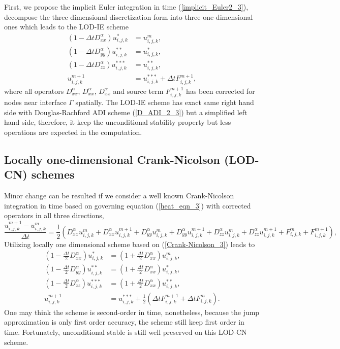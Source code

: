 \documentclass[dissertation]{uathesis}
\begin{document}
\begin{body}
First, we propose the implicit Euler integration in time (\ref{implicit_Euler2_3}), decompose the three dimensional discretization form into three one-dimensional ones which leads to the LOD-IE scheme
%
\begin{align} \label{D_LODIE_3}
(1-\Delta t D^{\alpha}_{xx}) u^{*}_{i,j,k}   &= u^{m}_{i,j,k}, \nonumber \\
(1-\Delta t D^{\alpha}_{yy}) u^{**}_{i,j,k}  &= u^{*}_{i,j,k},  \\
(1-\Delta t D^{\alpha}_{zz}) u^{***}_{i,j,k} &= u^{**}_{i,j,k}, \nonumber \\
u^{m+1}_{i,j,k} &= u^{***}_{i,j,k} + \Delta t F^{m+1}_{i,j,k},
\end{align}
%
where all operators $D^{\alpha}_{xx}$, $D^{\alpha}_{xx}$, $D^{\alpha}_{xx}$ and source term $F^{m+1}_{i,j,k}$ has been corrected for nodes near interface $\Gamma$ spatially. The LOD-IE scheme has exact same right hand side with Douglas-Rachford ADI scheme (\ref{D_ADI_2_3}) but a simplified left hand side, therefore, it keep the unconditional stability property but less operations are expected in the computation.

\subsection{Locally one-dimensional Crank-Nicolson (LOD-CN) schemes}
Minor change can be resulted if we consider a well known Crank-Nicolson integration in time based on governing equation (\ref{heat_eqn_3}) with corrected operators in all three directions, 
%
\begin{equation} \label{Crank-Nicolson_3}
\frac{u^{m+1}_{i,j,k}-u^{m}_{i,j,k}}{\Delta t} = 
\frac{1}{2}(D^{\alpha}_{xx} u^{m}_{i,j,k} + D^{\alpha}_{xx} u^{m+1}_{i,j,k} + D^{\alpha}_{yy} u^{m}_{i,j,k} + D^{\alpha}_{yy} u^{m+1}_{i,j,k} + D^{\alpha}_{zz} u^{m}_{i,j,k} + D^{\alpha}_{zz} u^{m+1}_{i,j,k} + F^{m}_{i,j,k} + F^{m+1}_{i,j,k}),
\end{equation}
%
Utilizing locally one dimensional scheme based on (\ref{Crank-Nicolson_3}) leads to
%
\begin{align} \label{D_LODCN_3}
(1-\frac{\Delta t}{2} D^{\alpha}_{xx}) u^{*}_{i,j,k}   &= (1+\frac{\Delta t}{2} D^{\alpha}_{xx})u^{m}_{i,j,k}, \nonumber \\
(1-\frac{\Delta t}{2} D^{\alpha}_{yy}) u^{**}_{i,j,k}  &= (1+\frac{\Delta t}{2} D^{\alpha}_{xx})u^{*}_{i,j,k},  \\
(1-\frac{\Delta t}{2} D^{\alpha}_{zz}) u^{***}_{i,j,k} &= (1+\frac{\Delta t}{2} D^{\alpha}_{xx})u^{**}_{i,j,k}, \nonumber \\
u^{m+1}_{i,j,k} &= u^{***}_{i,j,k} + \frac{1}{2} (\Delta t F^{m+1}_{i,j,k} + \Delta t F^{m}_{i,j,k}).
\end{align}
%
One may think the scheme is second-order in time, nonetheless, because the jump approximation is only first order accuracy, the scheme still keep first order in time. Fortunately, unconditional stable is still well preserved on this LOD-CN scheme. 


\end{body}
\end{document}
